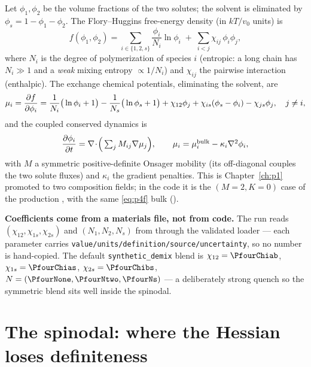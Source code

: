 Let $\phi_1,\phi_2$ be the volume fractions of the two solutes; the
solvent is eliminated by $\phi_s = 1-\phi_1-\phi_2$. The Flory--Huggins
free-energy density (in $kT/v_0$ units) is
%
\begin{equation}
  f(\phi_1,\phi_2) = \sum_{i\in\{1,2,s\}} \frac{\phi_i}{N_i}\ln\phi_i
    \;+\; \sum_{i<j}\chi_{ij}\,\phi_i\phi_j ,
  \label{eq:p4f}
\end{equation}
%
where $N_i$ is the degree of polymerization of species $i$ (entropic:
a long chain has $N_i\gg1$ and a \emph{weak} mixing entropy $\propto1/N_i$)
and $\chi_{ij}$ the pairwise interaction (enthalpic). The exchange
chemical potentials, eliminating the solvent, are
%
\begin{equation}
  \mu_i = \frac{\partial f}{\partial \phi_i}
    = \frac{1}{N_i}\big(\ln\phi_i+1\big)
      - \frac{1}{N_s}\big(\ln\phi_s+1\big)
      + \chi_{12}\phi_j + \chi_{is}(\phi_s-\phi_i) - \chi_{js}\phi_j,
  \quad j\neq i,
  \label{eq:p4mu}
\end{equation}
%
and the coupled conserved dynamics is
%
\begin{equation}
  \frac{\partial \phi_i}{\partial t} = \nabla\!\cdot\!\Big(\textstyle\sum_j M_{ij}\nabla\mu_j\Big),
  \qquad \mu_i = \mu_i^{\text{bulk}} - \kappa_i\nabla^2\phi_i ,
\end{equation}
%
with $M$ a symmetric positive-definite Onsager mobility (its off-diagonal
couples the two solute fluxes) and $\kappa_i$ the gradient penalties. This
is Chapter~\ref{ch:p1} promoted to two composition fields; in the code it
is the $(M{=}2,K{=}0)$ case of the production
, with the same \eqref{eq:p4f} bulk ().

\begin{keybox}
\textbf{Coefficients come from a materials file, not from code.} The run
reads $(\chi_{12},\chi_{1s},\chi_{2s})$ and $(N_1,N_2,N_s)$ from
 through the validated loader
 --- each parameter carries
\texttt{value/units/definition/source/uncertainty}, so no number is
hand-copied. The default \texttt{synthetic\_demix} blend is
$\chi_{12}=\PfourChiab$, $\chi_{1s}=\PfourChias$, $\chi_{2s}=\PfourChibs$,
$N=(\PfourNone,\PfourNtwo,\PfourNs)$ --- a deliberately strong quench so the
symmetric blend sits well inside the spinodal.
\end{keybox}

\section{The spinodal: where the Hessian loses definiteness}

